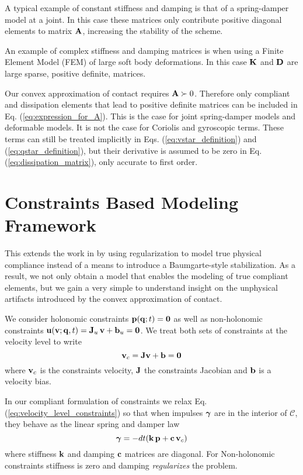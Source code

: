 A typical example of constant stiffness and damping is that of a spring-damper
model at a joint. In this case these matrices only contribute positive diagonal
elements to matrix ${\mathbf{A}}$, increasing the stability of the scheme.

An example of complex stiffness and damping matrices is when using a Finite
Element Model (FEM) of large soft body deformations. In this case ${\mathbf{K}}$ and
${\mathbf{D}}$ are large sparse, positive definite, matrices.

Our convex approximation of contact requires ${\mathbf{A}}\succ 0$. Therefore only
compliant and dissipation elements that lead to positive definite matrices can
be included in Eq. (\ref{eq:expression_for_A}). This is the case for joint
spring-damper models and deformable models. It is not the case for Coriolis and
gyroscopic terms. These terms can still be treated implicitly in Eqs.
(\ref{eq:vstar_definition}) and (\ref{eq:qstar_definition}), but their
derivative is assumed to be zero in Eq. (\ref{eq:dissipation_matrix}), only
accurate to first order.

\section{Constraints Based Modeling Framework}
\label{sec:constraints_based_modeling_framework}

This extends the work in \cite{bib:todorov2014} by using regularization to model
true physical compliance instead of a means to introduce a Baumgarte-style
stabilization. As a result, we not only obtain a model that enables the modeling
of true compliant elements, but we gain a very simple to understand insight on
the unphysical artifacts introduced by the convex approximation of contact.

We consider holonomic constraints ${\mathbf{p}}({\mathbf{q}};t)={\mathbf{0}}$ as well as
non-holonomic constraints ${\mathbf{u}}({\mathbf{v}}; {\mathbf{q}},t)={\mathbf{J}}_u\,{\mathbf{v}}+{\mathbf{b}}_u=
{\mathbf{0}}$. We treat both sets of constraints at the velocity level to write
\begin{equation}
	\mf{v}_c = \mf{J}\mf{v}+\mf{b}=\mf{0}
	\label{eq:velocity_level_constraints}
\end{equation}
where ${\mathbf{v}}_c$ is the constraints velocity, ${\mathbf{J}}$ the constraints Jacobian
and ${\mathbf{b}}$ is a velocity bias.

In our compliant formulation of constraints we relax Eq.
(\ref{eq:velocity_level_constraints}) so that when impulses ${\bm\gamma}$ are in the
interior of $\mathcal{C}$, they behave as the linear spring and damper law
\begin{equation}
	\bgamma = -dt(\mf{k}\,\mf{p} + \mf{c}\,\mf{v}_c)
	\label{eq:compliant_constraints}
\end{equation}
where stiffness ${\mathbf{k}}$ and damping ${\mathbf{c}}$ matrices are diagonal. For
Non-holonomic constraints stiffness is zero and damping \textit{regularizes} the
problem.

